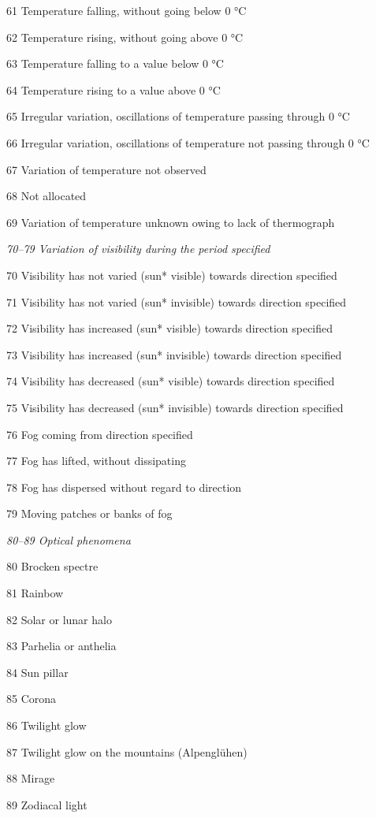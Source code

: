 61 Temperature falling, without going below 0 °C

62 Temperature rising, without going above 0 °C

63 Temperature falling to a value below 0 °C

64 Temperature rising to a value above 0 °C

65 Irregular variation, oscillations of temperature passing through 0 °C

66 Irregular variation, oscillations of temperature not passing through 0 °C

67 Variation of temperature not observed

68 Not allocated

69 Variation of temperature unknown owing to lack of thermograph

\emph{70--79 Variation of visibility during the period specified}

70 Visibility has not varied (sun* visible) towards direction specified

71 Visibility has not varied (sun* invisible) towards direction specified

72 Visibility has increased (sun* visible) towards direction specified

73 Visibility has increased (sun* invisible) towards direction specified

74 Visibility has decreased (sun* visible) towards direction specified

75 Visibility has decreased (sun* invisible) towards direction specified

76 Fog coming from direction specified

77 Fog has lifted, without dissipating

78 Fog has dispersed without regard to direction

79 Moving patches or banks of fog

\emph{80--89 Optical phenomena}

80 Brocken spectre

81 Rainbow

82 Solar or lunar halo

83 Parhelia or anthelia

84 Sun pillar

85 Corona

86 Twilight glow

87 Twilight glow on the mountains (Alpenglühen)

88 Mirage

89 Zodiacal light


